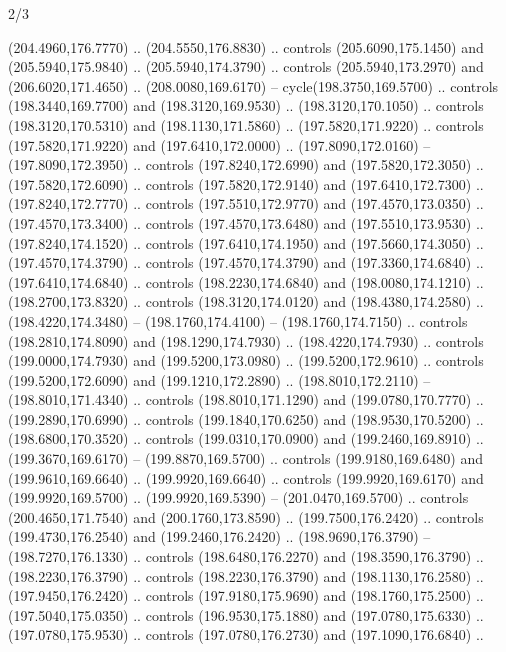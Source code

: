 \begin{flagdescription}{2/3}
\begin{scope}[xshift=0.5\flaglength,yshift=0.5\flagwidth,scale=\flagwidth/259.2]
\begin{scope}[y=0.8pt, x=0.8pt, yscale=-1,shift={(-243,-162)}]
      (204.4960,176.7770) .. (204.5550,176.8830) .. controls (205.6090,175.1450) and
      (205.5940,175.9840) .. (205.5940,174.3790) .. controls (205.5940,173.2970) and
      (206.6020,171.4650) .. (208.0080,169.6170) -- cycle(198.3750,169.5700) ..
      controls (198.3440,169.7700) and (198.3120,169.9530) .. (198.3120,170.1050) ..
      controls (198.3120,170.5310) and (198.1130,171.5860) .. (197.5820,171.9220) ..
      controls (197.5820,171.9220) and (197.6410,172.0000) .. (197.8090,172.0160) --
      (197.8090,172.3950) .. controls (197.8240,172.6990) and (197.5820,172.3050) ..
      (197.5820,172.6090) .. controls (197.5820,172.9140) and (197.6410,172.7300) ..
      (197.8240,172.7770) .. controls (197.5510,172.9770) and (197.4570,173.0350) ..
      (197.4570,173.3400) .. controls (197.4570,173.6480) and (197.5510,173.9530) ..
      (197.8240,174.1520) .. controls (197.6410,174.1950) and (197.5660,174.3050) ..
      (197.4570,174.3790) .. controls (197.4570,174.3790) and (197.3360,174.6840) ..
      (197.6410,174.6840) .. controls (198.2230,174.6840) and (198.0080,174.1210) ..
      (198.2700,173.8320) .. controls (198.3120,174.0120) and (198.4380,174.2580) ..
      (198.4220,174.3480) -- (198.1760,174.4100) -- (198.1760,174.7150) .. controls
      (198.2810,174.8090) and (198.1290,174.7930) .. (198.4220,174.7930) .. controls
      (199.0000,174.7930) and (199.5200,173.0980) .. (199.5200,172.9610) .. controls
      (199.5200,172.6090) and (199.1210,172.2890) .. (198.8010,172.2110) --
      (198.8010,171.4340) .. controls (198.8010,171.1290) and (199.0780,170.7770) ..
      (199.2890,170.6990) .. controls (199.1840,170.6250) and (198.9530,170.5200) ..
      (198.6800,170.3520) .. controls (199.0310,170.0900) and (199.2460,169.8910) ..
      (199.3670,169.6170) -- (199.8870,169.5700) .. controls (199.9180,169.6480) and
      (199.9610,169.6640) .. (199.9920,169.6640) .. controls (199.9920,169.6170) and
      (199.9920,169.5700) .. (199.9920,169.5390) -- (201.0470,169.5700) .. controls
      (200.4650,171.7540) and (200.1760,173.8590) .. (199.7500,176.2420) .. controls
      (199.4730,176.2540) and (199.2460,176.2420) .. (198.9690,176.3790) --
      (198.7270,176.1330) .. controls (198.6480,176.2270) and (198.3590,176.3790) ..
      (198.2230,176.3790) .. controls (198.2230,176.3790) and (198.1130,176.2580) ..
      (197.9450,176.2420) .. controls (197.9180,175.9690) and (198.1760,175.2500) ..
      (197.5040,175.0350) .. controls (196.9530,175.1880) and (197.0780,175.6330) ..
      (197.0780,175.9530) .. controls (197.0780,176.2730) and (197.1090,176.6840) ..

\end{scope}
\end{scope}
\end{flagdescription}
